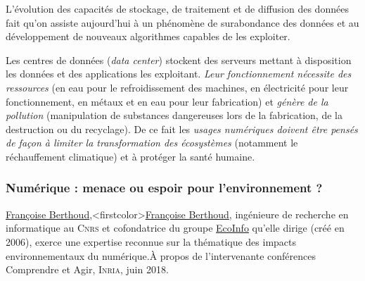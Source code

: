 \begin{tcolorbox}[title={Impacts sur les pratiques humaines}, toprule=0pt, leftrule=0pt, rightrule=0pt, arc=0pt,
                  fonttitle=\scshape\boxtitlefont,
                  colbacktitle=white, coltitle=firstcolor, colframe=firstcolor, colback=firstcolor!10,
                  breakable, enhanced jigsaw]
L’évolution des capacités de stockage, de traitement et de diffusion des données fait qu’on assiste aujourd’hui à un phénomène de surabondance des données et au développement de nouveaux algorithmes capables de les exploiter.

Les centres de données (\textit{data center}) stockent des serveurs mettant à disposition les données et des applications les exploitant. \emph{Leur fonctionnement nécessite des ressources} (en eau pour le refroidissement des machines, en électricité pour leur fonctionnement, en métaux et en eau pour leur fabrication) et \emph{génère de la pollution} (manipulation de substances dangereuses lors de la fabrication, de la destruction ou du recyclage). De ce fait les \emph{usages numériques doivent être pensés de façon à limiter la transformation des écosystèmes} (notamment le réchauffement climatique) et à protéger la santé humaine.
\end{tcolorbox}

\subsubsection[Numérique : menace ou espoir pour l’environnement ?]{Numérique : menace ou espoir pour l’environnement ?}
\label{subsub:IX.4.1.2}

\noindent \href{https://ecoinfo.cnrs.fr/les-membres/francoise-berthoud-2/}{Françoise Berthoud},\caution[t]<firstcolor>{\href{https://ecoinfo.cnrs.fr/les-membres/francoise-berthoud-2/}{Françoise Berthoud}, ingénieure de recherche en informatique au \textsc{Cnrs} et cofondatrice du groupe \href{https://ecoinfo.cnrs.fr/}{EcoInfo} qu'elle dirige (créé en 2006), exerce une expertise reconnue sur la thématique des impacts environnementaux du numérique.}{À propos de l'intervenante} 
 conférences Comprendre et Agir, \textsc{Inria}, juin 2018.
\parnotes

\vspace{6pt}

